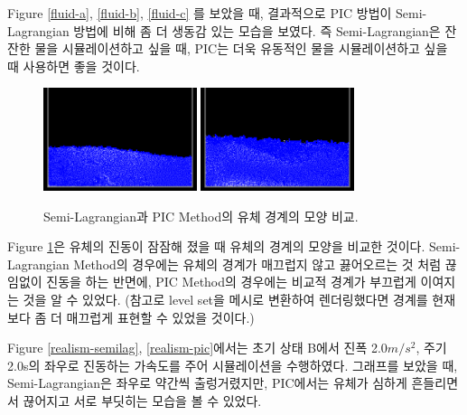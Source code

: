 \documentclass[11pt, A4]{article}
\begin{document}
Figure \ref{fluid-a}, \ref{fluid-b}, \ref{fluid-c} 를 보았을 때, 결과적으로 PIC 방법이 Semi-Lagrangian 방법에 비해 좀 더 생동감 있는 모습을 보였다. 즉 Semi-Lagrangian은 잔잔한 물을 시뮬레이션하고 싶을 때, PIC는 더욱 유동적인 물을 시뮬레이션하고 싶을 때 사용하면 좋을 것이다.

\begin{figure}[h]
  \centering
\includegraphics[width=0.40\textwidth]{pic-perturb-1}
\includegraphics[width=0.40\textwidth]{semilag-perturb-4}
  \caption{Semi-Lagrangian과 PIC Method의 유체 경계의 모양 비교.}
  \label{fluid-boundary}
\end{figure}

Figure \ref{fluid-boundary}은 유체의 진동이 잠잠해 졌을 때 유체의 경계의 모양을 비교한 것이다. Semi-Lagrangian Method의 경우에는 유체의 경계가 매끄럽지 않고 끓어오르는 것 처럼 끊임없이 진동을 하는 반면에, PIC Method의 경우에는 비교적 경계가 부끄럽게 이여지는 것을 알 수 있었다. (참고로 level set을 메시로 변환하여 렌더링했다면 경계를 현재보다 좀 더 매끄럽게 표현할 수 있었을 것이다.)


Figure \ref{realism-semilag}, \ref{realism-pic}에서는 초기 상태 B에서 진폭 2.0$m/s^2$, 주기 2.0s의 좌우로 진동하는 가속도를 주어 시뮬레이션을 수행하였다. 그래프를 보았을 때, Semi-Lagrangian은 좌우로 약간씩 출렁거렸지만, PIC에서는 유체가 심하게 흔들리면서 끊어지고 서로 부딧히는 모습을 볼 수 있었다.
\end{document}
